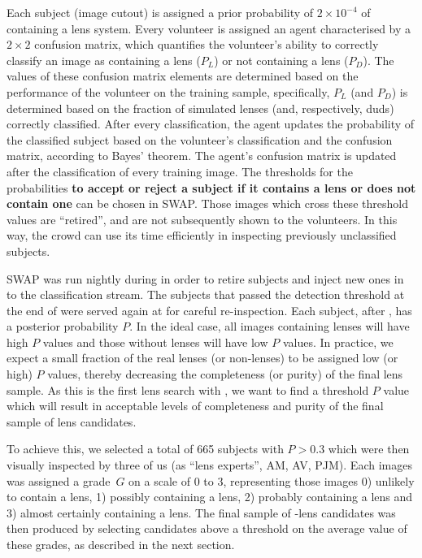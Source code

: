 \documentclass[useAMS,usenatbib,a4paper]{mn2e}
\begin{document}
Each subject (image cutout) is assigned a prior probability of
$2\times10^{-4}$ of containing a lens system. Every volunteer
is assigned an agent characterised by a $2\times2$ confusion matrix,
which quantifies the volunteer's ability to correctly classify an image
as containing a lens ($P_L$) or not containing a lens ($P_D$). The values of
these confusion matrix elements are determined based on the performance of the
volunteer on the training sample, specifically, $P_L$ (and $P_D$) is
determined based on the fraction of simulated lenses (and, respectively, duds)
correctly classified. After every classification, the agent updates the
probability of the classified subject based on the volunteer's classification
and the confusion matrix, according to Bayes' theorem.
The agent's confusion matrix is updated after the
classification of every training image. The thresholds for the
probabilities {\bf to accept or reject a subject if it contains a lens or does
not contain one} can be chosen in SWAP. Those images which cross
these threshold values are ``retired'', and are not subsequently shown to the
volunteers. In this way, the crowd can use its time efficiently in
inspecting previously unclassified subjects.

SWAP was run nightly during \StageOne in order to retire subjects and inject new
ones in to the classification stream. The subjects that passed the detection
threshold at the end of \StageOne were served again at \StageTwo for careful
re-inspection. Each subject, after \StageTwo, has a posterior
probability $P$. In the ideal case, all images containing lenses will have high $P$
values and those without lenses will have low $P$ values. In practice, we expect a
small fraction of the real lenses (or non-lenses) to be assigned low (or high) $P$
values, thereby decreasing the completeness (or purity) of the final lens
sample. As this is the first lens search with \sw, we want to find a
threshold $P$ value which will result in acceptable levels of completeness and
purity of the final sample of lens candidates.

To achieve this, we selected a total of 665 subjects with $P>0.3$
which were then visually inspected by three of us (as ``lens experts'',
 AM, AV, PJM).  Each images was assigned a grade~$G$ on a scale of 0 to 3,
representing those images
0) unlikely to contain a lens, 1) possibly containing a lens, 2) probably
containing a lens and 3) almost certainly containing a
lens. The final sample of \sw-\cfhtls lens candidates was
then produced by selecting candidates above a threshold on the
average value of these grades, as described in the next section.
\end{document}
